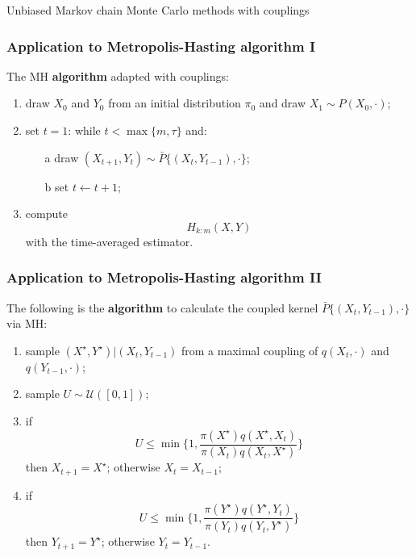 \documentclass{beamer}
\begin{document}
\begin{section}{Unbiased Markov chain Monte Carlo methods with couplings}
\begin{frame}
	\end{frame}

	\begin{frame}
	 	\frametitle{Application to Metropolis-Hasting algorithm I}
		The MH \textbf{algorithm} adapted with couplings:
	 	\vspace{0.3cm}
	 	\begin{enumerate}
	 		\item draw $X_0$ and $Y_0$ from an initial distribution $\pi_0$ and draw $X_1 \sim P(X_0, \cdot)$;
	 		\item set $t=1$: while $t<\max\{m,\tau\}$ and:
	 		\begin{itemize}
	 			\item[a] draw $(X_{t+1}, Y_t)\sim \bar P \{(X_t, Y_{t-1}), \cdot \}$;
	 			\item[b] set $t \leftarrow t+1$;
	 		\end{itemize}
	 		\item compute 
	 		$$ H_{k:m}(X,Y)$$
	 		with the time-averaged estimator.
	 	\end{enumerate}
	\end{frame}

	\begin{frame} 	
		\frametitle{Application to Metropolis-Hasting algorithm II}
	 	The following is the \textbf{algorithm} to calculate the coupled kernel $\bar P \{(X_t, Y_{t-1}), \cdot \}$ via MH:
	 	\begin{enumerate}
	 		\item sample $(X^\star, Y^\star) | (X_t, Y_{t-1})$ from a maximal coupling of $q(X_t, \cdot)$ and $q(Y_{t-1}, \cdot)$;
	 		\item sample $U \sim \mathcal{U}([0,1])$;
	 		\item if
	 		$$ U
	 		\leq \min\bigg \{
	 		1,
	 		\frac{ \pi(X^\star)q(X^\star,X_t)}{
	 			\pi(X_t)q(X_t, X^\star)}
	 		\bigg \}
	 		$$
	 		then $X_{t+1} = X^\star$; otherwise $X_t = X_{t-1}$;
	 		\item if
	 		$$ U
	 		\leq \min\bigg \{ 
	 		1,
	 		\frac{ \pi(Y^\star)q(Y^\star,Y_t)}{
	 			\pi(Y_t)q(Y_t, Y^\star)}
	 		\bigg \}
	 		$$
	 		then $Y_{t+1} = Y^\star$; otherwise $Y_t = Y_{t-1}$.
	 	\end{enumerate}
	\end{frame}

\end{section}
\end{document}
